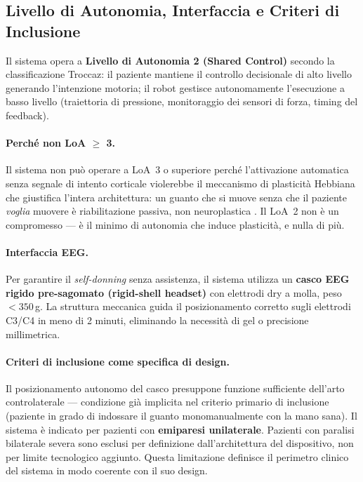 \documentclass[a4paper,11pt]{article}
\begin{document}
\subsection{Livello di Autonomia, Interfaccia e Criteri di Inclusione}
\label{subsec:loa}

Il sistema opera a \textbf{Livello di Autonomia 2 (Shared Control)} secondo la
classificazione Troccaz: il paziente mantiene il controllo decisionale di alto
livello generando l'intenzione motoria; il robot gestisce autonomamente
l'esecuzione a basso livello (traiettoria di pressione, monitoraggio dei sensori
di forza, timing del feedback).

\paragraph{Perché non LoA $\geq$ 3.}
Il sistema non può operare a LoA~3 o superiore perché l'attivazione automatica
senza segnale di intento corticale violerebbe il meccanismo di plasticità Hebbiana
che giustifica l'intera architettura: un guanto che si muove senza che il paziente
\textit{voglia} muovere è riabilitazione passiva, non neuroplastica
\cite{biasiucci2018brain, krueger2024hebbian}. Il LoA~2 non è un compromesso — è
il minimo di autonomia che induce plasticità, e nulla di più.

\paragraph{Interfaccia EEG.}
Per garantire il \textit{self-donning} senza assistenza, il sistema utilizza un
\textbf{casco EEG rigido pre-sagomato (rigid-shell headset)} con elettrodi dry a
molla, peso $<350$\,g. La struttura meccanica guida il posizionamento corretto
sugli elettrodi C3/C4 in meno di 2 minuti, eliminando la necessità di gel o
precisione millimetrica.

\paragraph{Criteri di inclusione come specifica di design.}
Il posizionamento autonomo del casco presuppone funzione sufficiente dell'arto
controlaterale — condizione già implicita nel criterio primario di inclusione
(paziente in grado di indossare il guanto monomanualmente con la mano sana). Il
sistema è indicato per pazienti con \textbf{emiparesi unilaterale}. Pazienti con
paralisi bilaterale severa sono esclusi per definizione dall'architettura del
dispositivo, non per limite tecnologico aggiunto. Questa limitazione definisce il
perimetro clinico del sistema in modo coerente con il suo design.
\end{document}
